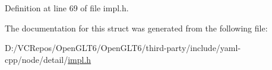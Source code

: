 Definition at line 69 of file impl.\+h.



The documentation for this struct was generated from the following file\+:\begin{DoxyCompactItemize}
\item 
D\+:/\+V\+C\+Repos/\+Open\+G\+L\+T6/\+Open\+G\+L\+T6/third-\/party/include/yaml-\/cpp/node/detail/\mbox{\hyperlink{detail_2impl_8h}{impl.\+h}}\end{DoxyCompactItemize}
